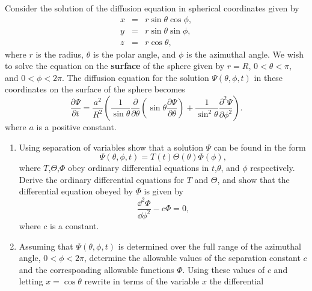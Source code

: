 {%
\begin{Exercise}
  \label{exercise diffusion spherical separation}
  Consider the solution of the diffusion
  equation in spherical coordinates given by
  \begin{eqnarray*}
    x &=& r \sin \theta \cos \phi, \\
    y &=& r \sin \theta \sin \phi, \\
    z &=& r \cos \theta,
  \end{eqnarray*}
  where $r$ is the radius, $\theta$ is the polar angle, and $\phi$ is
  the azimuthal angle. 
  We wish to solve the equation on the {\bf surface} of the sphere given 
  by $ r = R$, $ 0 < \theta < \pi$, and $ 0 < \phi < 2\pi$.  The
  diffusion equation for the solution $\Psi(\theta,\phi,t)$ 
  in these coordinates on the surface of the sphere becomes
  \begin{equation}
    \label{fpdfracPsit=fraca^2R^2left(frac1sintheta}
    \frac{\partial \Psi}{\partial t} = \frac{a^2}{R^2} \left( \frac{1}{\sin \theta}
      \frac{\partial}{\partial \theta} \left( \sin \theta \frac{\partial \Psi}{\partial \theta} \right) 
      + \frac{1}{\sin^2 \theta} \frac{\partial^2 \Psi}{\partial \phi^2} \right).
  \end{equation}
  where  $a$ is a positive constant.
  \begin{enumerate}
  \item Using separation of variables show that a solution
    $\Psi$ can be found in the form
    \begin{displaymath}
      \Psi(\theta,\phi,t) = T(t) \Theta(\theta) \Phi(\phi),
    \end{displaymath}
    where $T$,$\Theta$,$\Phi$ obey ordinary differential equations
    in $t$,$\theta$, and $\phi$ respectively. 
    Derive the ordinary differential equations
    for $T$ and $\Theta$, and 
    show that  the differential equation obeyed by $\Phi$ is given by
    \begin{displaymath}
      \frac{\dd^2 \Phi}{\dd \phi^2} - c \Phi = 0,
    \end{displaymath}
    where $c$ is a constant.
  \item Assuming that $\Psi(\theta,\phi,t)$ is determined over the 
    full range of the azimuthal angle, $ 0 < \phi < 2\pi$, determine the 
    allowable values of the separation constant $c$ and the corresponding
    allowable functions $\Phi$. Using these values of $c$ and letting
    $x = \cos \theta$ rewrite in terms of the variable $x$ the differential

\end{enumerate}
\end{Exercise}}
